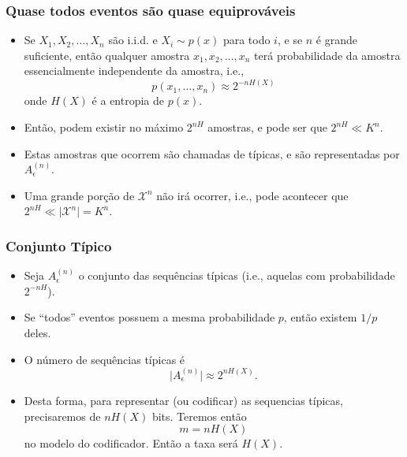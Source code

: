 \begin{frame}%
  \frametitle{Quase todos eventos são quase equiprováveis}
  \begin{itemize}
  \item Se $X_1,X_2,\ldots,X_n$ são i.i.d. e $X_i \sim p(x)$ para todo $i$, e se $n$ é grande suficiente, 
        então qualquer amostra $x_1,x_2,\ldots,x_n$ terá 
        probabilidade da amostra essencialmente independente da amostra, i.e.,
        \begin{equation}
        p(x_1,\ldots,x_n) \approx 2^{-nH(X)}
        \end{equation}
        onde $H(X)$ é a entropia de $p(x)$.
  \item Então, podem existir no máximo $2^{nH}$ amostras, e pode ser que $2^{nH} \ll K^n$.
  \item Estas amostras que ocorrem são chamadas de típicas, e são representadas por $A_\epsilon^{(n)}$.
  \item Uma grande porção de $\mathcal{X}^n$ não irá ocorrer, i.e., pode acontecer que 
        $2^{nH} \ll \vert \mathcal{X}^n \vert = K^n$.
  \end{itemize}
\end{frame}

\begin{frame}%
  \frametitle{Conjunto Típico}
  \begin{itemize}
  \item Seja $A_\epsilon^{(n)}$ o conjunto das sequências típicas (i.e., aquelas com probabilidade $2^{-nH}$).
  \item Se ``todos'' eventos possuem a mesma probabilidade $p$, então existem $1/p$ deles.
  \item O número de sequências típicas é
        \begin{equation}
        \vert A_\epsilon^{(n)} \vert \approx 2^{nH(X)}.
        \end{equation}
  \item Desta forma, para representar (ou codificar) as sequencias típicas, precisaremos de
        $nH(X)$ bits. Teremos então
        \begin{equation}
        m = nH(X)
        \end{equation}
        no modelo do codificador. Então a taxa será $H(X)$.
  \end{itemize}

\end{frame}


